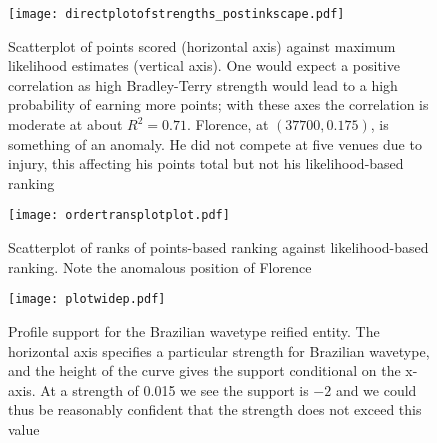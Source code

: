 \documentclass{article}
\begin{document}

\begin{figure}[h]
  \texttt{[image: directplotofstrengths\_postinkscape.pdf]}  %
\caption{Scatterplot of points scored (horizontal
  axis) \label{compare_likelihood_points} against maximum likelihood
  estimates (vertical axis).  One would expect a positive correlation
  as high Bradley-Terry strength would lead to a high probability of
  earning more points; with these axes the correlation is moderate at
  about $R^2=0.71$.  Florence, at $(37700,0.175)$, is something of an
  anomaly. He did not compete at five venues due to injury, this
  affecting his points total but not his likelihood-based
  ranking}
\end{figure}

\clearpage
\newpage

\begin{figure}[h]
\texttt{[image: ordertransplotplot.pdf]}
\caption{Scatterplot of ranks \label{compare_likelihood_points_rankings} of points-based ranking
against likelihood-based ranking.  Note the anomalous position of
Florence}
\end{figure}

\clearpage
\newpage

\begin{figure}[h]
  \texttt{[image: plotwidep.pdf]}
\caption{Profile support \label{brazilian_wavetype_support} for the
  Brazilian wavetype reified entity.  The horizontal axis specifies a
  particular strength for Brazilian wavetype, and the height of the
  curve gives the support conditional on the x-axis.  At a strength of
  0.015 we see the support is $-2$ and we could thus be reasonably
  confident that the strength does not exceed this value}
\end{figure}
\end{document}
